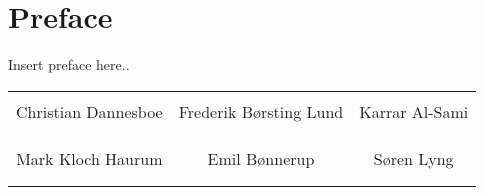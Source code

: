 \chapter*{Preface}
Insert preface here..
\phantom{Luft}

\phantom{Luft}

\begin{table}[H]
	\centering
		\begin{tabular}{c c c}
			\underline{\phantom{mmmmmmmmmmmmmm}} & \underline{\phantom{mmmmmmmmmmmmmm}} & \underline{\phantom{mmmmmmmmmmmmmm}} \\
			Christian Dannesboe			& Frederik Børsting Lund 		& Karrar Al-Sami 			\\
			&&\\
			&&\\
			\underline{\phantom{mmmmmmmmmmmmmm}} & \underline{\phantom{mmmmmmmmmmmmmm}} & \underline{\phantom{mmmmmmmmmmmmmm}} \\
			Mark Kloch Haurum			& Emil Bønnerup 		& Søren Lyng 				\\
			&&\\
			&&\\
		 																		
		\end{tabular}
\end{table}